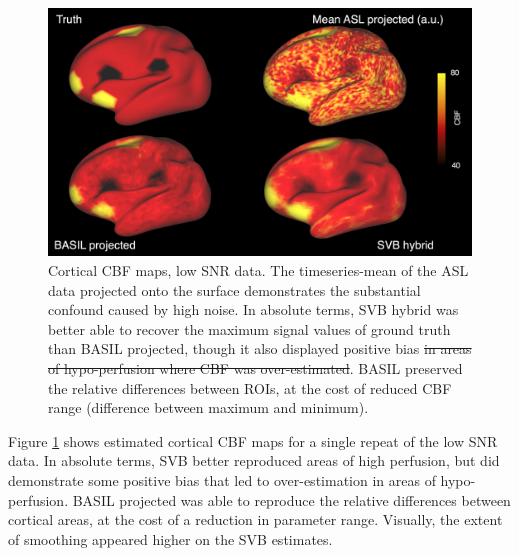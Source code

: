 \documentclass[12pt]{report}
\providecommand{\DIFaddtex}[1]{{\protect\color{blue}\uwave{#1}}} %
\providecommand{\DIFdeltex}[1]{{\protect\color{red}\sout{#1}}}                      %
\providecommand{\DIFaddFL}[1]{\DIFadd{#1}} %
\providecommand{\DIFdelFL}[1]{\DIFdel{#1}} %
\providecommand{\DIFaddbeginFL}{} %
\providecommand{\DIFaddendFL}{} %
\providecommand{\DIFdelbeginFL}{} %
\providecommand{\DIFdelendFL}{} %
\providecommand{\DIFadd}[1]{\texorpdfstring{\DIFaddtex{#1}}{#1}} %
\providecommand{\DIFdel}[1]{\texorpdfstring{\DIFdeltex{#1}}{}} %
\newcommand{\DIFscaledelfig}{0.5}
\newlength{\DIFdelgraphicswidth} %
\newlength{\DIFdelgraphicsheight} %
\newcommand{\DIFaddincludegraphics}[2][]{{\color{blue}\fbox{\DIFOincludegraphics[#1]{#2}}}} %
\newcommand{\DIFdelincludegraphics}[2][]{%
\sbox{\DIFdelgraphicsbox}{\DIFOincludegraphics[#1]{#2}}%
\settoboxwidth{\DIFdelgraphicswidth}{\DIFdelgraphicsbox} %
\settoboxtotalheight{\DIFdelgraphicsheight}{\DIFdelgraphicsbox} %
\scalebox{\DIFscaledelfig}{%
\parbox[b]{\DIFdelgraphicswidth}{\usebox{\DIFdelgraphicsbox}\\[-\baselineskip] \rule{\DIFdelgraphicswidth}{0em}}\llap{\resizebox{\DIFdelgraphicswidth}{\DIFdelgraphicsheight}{%
\setlength{\unitlength}{\DIFdelgraphicswidth}%
\begin{picture}(1,1)%
\thicklines\linethickness{2pt} %
{\color[rgb]{1,0,0}\put(0,0){\framebox(1,1){}}}%
{\color[rgb]{1,0,0}\put(0,0){\line( 1,1){1}}}%
{\color[rgb]{1,0,0}\put(0,1){\line(1,-1){1}}}%
\end{picture}%
}\hspace*{3pt}}} %
} %
\DeclareRobustCommand{\DIFaddbeginFL}{\DIFOaddbeginFL \let\includegraphics\DIFaddincludegraphics} %
\DeclareRobustCommand{\DIFaddendFL}{\DIFOaddendFL \let\includegraphics\DIFOincludegraphics} %
\DeclareRobustCommand{\DIFdelbeginFL}{\DIFOdelbeginFL \let\includegraphics\DIFdelincludegraphics} %
\DeclareRobustCommand{\DIFdelendFL}{\DIFOaddendFL \let\includegraphics\DIFOincludegraphics} %
\begin{document}
\begin{figure}[H]
\centering
\includegraphics[width=\textwidth]{roi_cbf_comparison.png}
\caption{Cortical CBF maps, low SNR data. The timeseries-mean of the ASL data projected onto the surface demonstrates the substantial confound caused by high noise. In absolute terms, SVB hybrid was better able to recover the maximum signal values of ground truth than BASIL projected, though it also displayed positive bias \DIFdelbeginFL \DIFdelFL{in areas of hypo-perfusion where CBF was over-estimated}\DIFdelendFL \DIFaddbeginFL \DIFaddFL{more generally}\DIFaddendFL . BASIL preserved the relative differences between ROIs, at the cost of reduced CBF range (difference between maximum and minimum).}
\label{roi_cbf_comparison} 
\end{figure}

Figure \ref{roi_cbf_comparison} shows estimated cortical CBF maps for a single repeat of the low SNR data. In absolute terms, SVB better reproduced areas of high perfusion, but did demonstrate some positive bias that led to over-estimation in areas of hypo-perfusion. BASIL projected was able to reproduce the relative differences between cortical areas, at the cost of a reduction in parameter range. Visually, the extent of smoothing appeared higher on the SVB estimates. 
\end{document}
